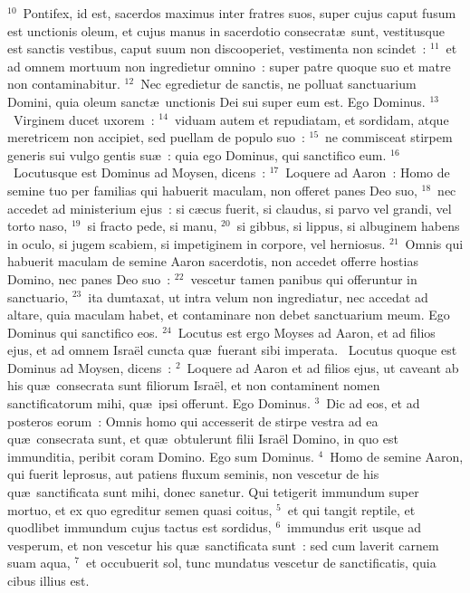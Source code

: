 ${}^{10}$~Pontifex, id est, sacerdos maximus inter fratres suos, super cujus caput fusum est unctionis oleum, et cujus manus in sacerdotio consecrat\ae\ sunt, vestitusque est sanctis vestibus, caput suum non discooperiet, vestimenta non scindet~:
${}^{11}$~et ad omnem mortuum non ingredietur omnino~: super patre quoque suo et matre non contaminabitur.
${}^{12}$~Nec egredietur de sanctis, ne polluat sanctuarium Domini, quia oleum sanct\ae\ unctionis Dei sui super eum est. Ego Dominus.
${}^{13}$~Virginem ducet uxorem~:
${}^{14}$~viduam autem et repudiatam, et sordidam, atque meretricem non accipiet, sed puellam de populo suo~:
${}^{15}$~ne commisceat stirpem generis sui vulgo gentis su\ae~: quia ego Dominus, qui sanctifico eum.
${}^{16}$~Locutusque est Dominus ad Moysen, dicens~:
${}^{17}$~Loquere ad Aaron~: Homo de semine tuo per familias qui habuerit maculam, non offeret panes Deo suo,
${}^{18}$~nec accedet ad ministerium ejus~: si c\ae cus fuerit, si claudus, si parvo vel grandi, vel torto naso,
${}^{19}$~si fracto pede, si manu,
${}^{20}$~si gibbus, si lippus, si albuginem habens in oculo, si jugem scabiem, si impetiginem in corpore, vel herniosus.
${}^{21}$~Omnis qui habuerit maculam de semine Aaron sacerdotis, non accedet offerre hostias Domino, nec panes Deo suo~:
${}^{22}$~vescetur tamen panibus qui offeruntur in sanctuario,
${}^{23}$~ita dumtaxat, ut intra velum non ingrediatur, nec accedat ad altare, quia maculam habet, et contaminare non debet sanctuarium meum. Ego Dominus qui sanctifico eos.
${}^{24}$~Locutus est ergo Moyses ad Aaron, et ad filios ejus, et ad omnem Isra\"el cuncta qu\ae\ fuerant sibi imperata.
~Locutus quoque est Dominus ad Moysen, dicens~:
${}^{2}$~Loquere ad Aaron et ad filios ejus, ut caveant ab his qu\ae\ consecrata sunt filiorum Isra\"el, et non contaminent nomen sanctificatorum mihi, qu\ae\ ipsi offerunt. Ego Dominus.
${}^{3}$~Dic ad eos, et ad posteros eorum~: Omnis homo qui accesserit de stirpe vestra ad ea qu\ae\ consecrata sunt, et qu\ae\ obtulerunt filii Isra\"el Domino, in quo est immunditia, peribit coram Domino. Ego sum Dominus.
${}^{4}$~Homo de semine Aaron, qui fuerit leprosus, aut patiens fluxum seminis, non vescetur de his qu\ae\ sanctificata sunt mihi, donec sanetur. Qui tetigerit immundum super mortuo, et ex quo egreditur semen quasi coitus,
${}^{5}$~et qui tangit reptile, et quodlibet immundum cujus tactus est sordidus,
${}^{6}$~immundus erit usque ad vesperum, et non vescetur his qu\ae\ sanctificata sunt~: sed cum laverit carnem suam aqua,
${}^{7}$~et occubuerit sol, tunc mundatus vescetur de sanctificatis, quia cibus illius est.
